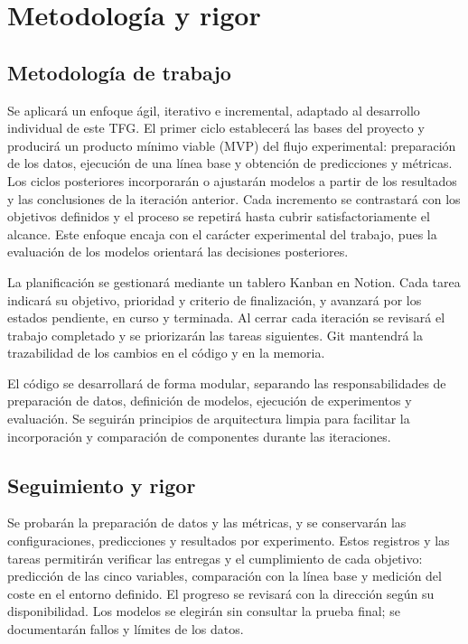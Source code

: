 \chapter{Metodología y rigor}
\label{chap:metodologia}

\section{Metodología de trabajo}

Se aplicará un enfoque ágil, iterativo e incremental, adaptado al desarrollo
individual de este TFG. El primer ciclo establecerá las bases del proyecto y
producirá un producto mínimo viable (MVP) del flujo experimental: preparación
de los datos, ejecución de una línea base y obtención de predicciones y
métricas. Los ciclos posteriores incorporarán o ajustarán modelos a partir de
los resultados y las conclusiones de la iteración anterior. Cada incremento se
contrastará con los objetivos definidos y el proceso se repetirá hasta cubrir
satisfactoriamente el alcance. Este enfoque encaja con el carácter experimental
del trabajo, pues la evaluación de los modelos orientará las decisiones
posteriores.

La planificación se gestionará mediante un tablero Kanban en Notion. Cada tarea
indicará su objetivo, prioridad y criterio de finalización, y avanzará por los
estados pendiente, en curso y terminada. Al cerrar cada iteración se revisará el
trabajo completado y se priorizarán las tareas siguientes. Git mantendrá la
trazabilidad de los cambios en el código y en la memoria.

El código se desarrollará de forma modular, separando las responsabilidades de
preparación de datos, definición de modelos, ejecución de experimentos y
evaluación. Se seguirán principios de arquitectura limpia para facilitar la
incorporación y comparación de componentes durante las iteraciones.

\section{Seguimiento y rigor}

Se probarán la preparación de datos y las métricas, y se conservarán las
configuraciones, predicciones y resultados por experimento. Estos registros y
las tareas permitirán verificar las entregas y el cumplimiento de cada
objetivo: predicción de las cinco variables, comparación con la línea base y
medición del coste en el entorno definido. El progreso se revisará con la
dirección según su disponibilidad. Los modelos se elegirán sin consultar la
prueba final; se documentarán fallos y límites de los datos.
